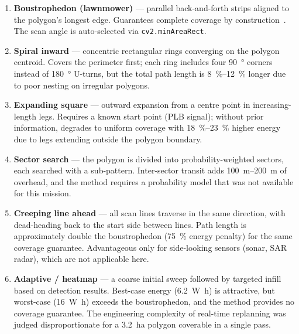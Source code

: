 \begin{enumerate}
  \item \textbf{Boustrophedon (lawnmower)} --- parallel back-and-forth strips aligned to the polygon's longest edge.
        Guarantees complete coverage by construction~\cite{choset2001coverage}.
        The scan angle is auto-selected via \texttt{cv2.minAreaRect}.

  \item \textbf{Spiral inward} --- concentric rectangular rings converging on the polygon centroid.
        Covers the perimeter first; each ring includes four \SI{90}{\degree} corners instead of \SI{180}{\degree} U-turns, but the total path length is \SIrange{8}{12}{\percent} longer due to poor nesting on irregular polygons.

  \item \textbf{Expanding square} --- outward expansion from a centre point in increasing-length legs.
        Requires a known start point (PLB signal); without prior information, degrades to uniform coverage with \SIrange{18}{23}{\percent} higher energy due to legs extending outside the polygon boundary.

  \item \textbf{Sector search} --- the polygon is divided into probability-weighted sectors, each searched with a sub-pattern.
        Inter-sector transit adds \SIrange{100}{200}{\metre} of overhead, and the method requires a probability model that was not available for this mission.

  \item \textbf{Creeping line ahead} --- all scan lines traverse in the same direction, with dead-heading back to the start side between lines.
        Path length is approximately double the boustrophedon (\SI{75}{\percent} energy penalty) for the same coverage guarantee.
        Advantageous only for side-looking sensors (sonar, SAR radar), which are not applicable here.

  \item \textbf{Adaptive / heatmap} --- a coarse initial sweep followed by targeted infill based on detection results.
        Best-case energy (\SI{6.2}{\watt\hour}) is attractive, but worst-case (\SI{16}{\watt\hour}) exceeds the boustrophedon, and the method provides no coverage guarantee.
        The engineering complexity of real-time replanning was judged disproportionate for a \SI{3.2}{\hectare} polygon coverable in a single pass.
\end{enumerate}

